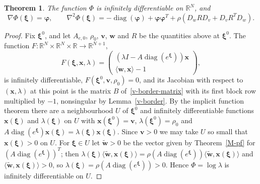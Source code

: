 \documentclass[11pt]{article}
\theoremstyle{plain}
\newtheorem{theorem}{Theorem}[section]
\theoremstyle{remark}
\numberwithin{equation}{section}
\begin{document}
\begin{theorem}\label{v-phi}
The function $\Phi$ is infinitely differentiable on $\mathbb{R}^N$, and
\begin{equation}\label{v-phi-derivs}
\nabla\Phi(\bm\xi)=\bm\varphi,\qquad
\nabla^2\Phi(\bm\xi)=-\operatorname{diag}(\bm\varphi)+\bm\varphi\bm\varphi^T
+\rho\left(D_wRD_v+D_vR^TD_w\right).
\end{equation}
\end{theorem}
\begin{proof}
Fix $\bm\xi^0$, and let $A_{e,0}$, $\rho_0$, $\bm v$, $\bm w$ and $R$ be the
quantities above at $\bm\xi^0$. The function
$F:\mathbb{R}^N\times\mathbb{R}^N\times\mathbb{R}\to\mathbb{R}^{N+1}$,
\begin{equation}
F(\bm\xi,\bm x,\lambda)=\begin{pmatrix}\left(\lambda I-A\operatorname{diag}\left(e^{\bm\xi}\right)\right)\bm x\\ \langle\bm w,\bm x\rangle-1\end{pmatrix},
\end{equation}
is infinitely differentiable, $F(\bm\xi^0,\bm v,\rho_0)=0$, and its Jacobian
with respect to $(\bm x,\lambda)$ at this point is the matrix $B$
of~\eqref{v-border-matrix} with its first block row multiplied by $-1$, nonsingular by
Lemma~\ref{v-border}. By the implicit function theorem there are a
neighbourhood $U$ of $\bm\xi^0$ and infinitely differentiable functions
$\bm x(\bm\xi)$ and $\lambda(\bm\xi)$ on $U$ with $\bm x(\bm\xi^0)=\bm v$,
$\lambda(\bm\xi^0)=\rho_0$ and
$A\operatorname{diag}\left(e^{\bm\xi}\right)\bm x(\bm\xi)=\lambda(\bm\xi)\bm x(\bm\xi)$.
Since $\bm v>0$ we may take $U$ so small that $\bm x(\bm\xi)>0$ on $U$. For
$\bm\xi\in U$ let $\widetilde{\bm w}>0$ be the vector given by Theorem~\ref{M-pf}
for $\left(A\operatorname{diag}\left(e^{\bm\xi}\right)\right)^T$; then
$\lambda(\bm\xi)\langle\widetilde{\bm w},\bm x(\bm\xi)\rangle
=\rho\left(A\operatorname{diag}\left(e^{\bm\xi}\right)\right)\langle\widetilde{\bm w},\bm x(\bm\xi)\rangle$
and $\langle\widetilde{\bm w},\bm x(\bm\xi)\rangle>0$, so
$\lambda(\bm\xi)=\rho\left(A\operatorname{diag}\left(e^{\bm\xi}\right)\right)>0$.
Hence $\Phi=\log\lambda$ is infinitely differentiable on $U$.


\end{proof}
\end{document}
